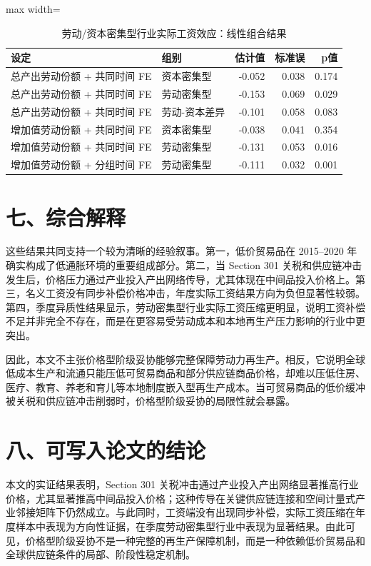 \documentclass[11pt]{ctexart}
\begin{document}
\begin{table}[H]
\centering
\caption{劳动/资本密集型行业实际工资效应：线性组合结果}
\small
\begin{adjustbox}{max width=\textwidth}
\begin{tabular}{llrrr}
\toprule
设定 & 组别 & 估计值 & 标准误 & p值 \\
\midrule
总产出劳动份额 + 共同时间 FE & 资本密集型 & -0.052 & 0.038 & 0.174 \\
总产出劳动份额 + 共同时间 FE & 劳动密集型 & -0.153 & 0.069 & 0.029 \\
总产出劳动份额 + 共同时间 FE & 劳动-资本差异 & -0.101 & 0.058 & 0.083 \\
增加值劳动份额 + 共同时间 FE & 资本密集型 & -0.038 & 0.041 & 0.354 \\
增加值劳动份额 + 共同时间 FE & 劳动密集型 & -0.131 & 0.053 & 0.016 \\
增加值劳动份额 + 分组时间 FE & 劳动密集型 & -0.111 & 0.032 & 0.001 \\
\bottomrule
\end{tabular}
\end{adjustbox}
\end{table}

\section*{七、综合解释}

这些结果共同支持一个较为清晰的经验叙事。第一，低价贸易品在 2015--2020 年确实构成了低通胀环境的重要组成部分。第二，当 Section 301 关税和供应链冲击发生后，价格压力通过产业投入产出网络传导，尤其体现在中间品投入价格上。第三，名义工资没有同步补偿价格冲击，年度实际工资结果方向为负但显著性较弱。第四，季度异质性结果显示，劳动密集型行业实际工资压缩更明显，说明工资补偿不足并非完全不存在，而是在更容易受劳动成本和本地再生产压力影响的行业中更突出。

因此，本文不主张价格型阶级妥协能够完整保障劳动力再生产。相反，它说明全球低成本生产和流通只能压低可贸易商品和部分供应链商品价格，却难以压低住房、医疗、教育、养老和育儿等本地制度嵌入型再生产成本。当可贸易商品的低价缓冲被关税和供应链冲击削弱时，价格型阶级妥协的局限性就会暴露。

\section*{八、可写入论文的结论}

本文的实证结果表明，Section 301 关税冲击通过产业投入产出网络显著推高行业价格，尤其显著推高中间品投入价格；这种传导在关键供应链连接和空间计量式产业邻接矩阵下仍然成立。与此同时，工资端没有出现同步补偿，实际工资压缩在年度样本中表现为方向性证据，在季度劳动密集型行业中表现为显著结果。由此可见，价格型阶级妥协不是一种完整的再生产保障机制，而是一种依赖低价贸易品和全球供应链条件的局部、阶段性稳定机制。
\end{document}
